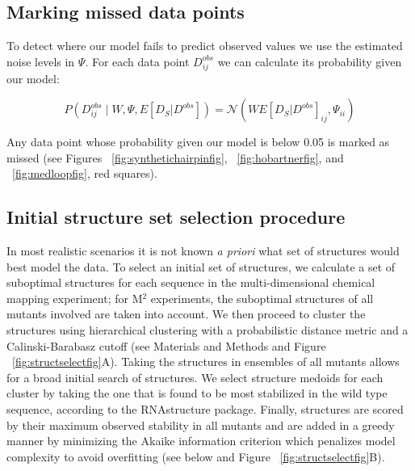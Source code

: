 \documentclass[12pt]{article}
\begin{document}
\subsection{Marking missed data points}
To detect where our model fails to predict observed values we use the estimated noise levels in $\Psi$. 
For each data point $D^{obs}_{ij}$ we can calculate its probability given our model: 

\[P(D^{obs}_{ij} \mid W,\Psi,E[D_S|D^{obs}]) = \mathcal{N}(WE[D_S|D^{obs}]_{ij},\Psi_{ii})\]

Any data point whose probability given our model is below 0.05 is marked as missed (see Figures ~\ref{fig:synthetichairpinfig}, ~\ref{fig:hobartnerfig}, and ~\ref{fig:medloopfig}, red squares).

\subsection{Initial structure set selection procedure}

In most realistic scenarios it is not known \textit{a priori} what set of structures would best model the data. 
To select an initial set of structures, we calculate a set of suboptimal structures for each sequence in the multi-dimensional chemical mapping experiment; for M$^2$ experiments, the suboptimal structures of all mutants involved are taken into account. 
We then proceed to cluster the structures using hierarchical clustering with a probabilistic distance metric and a Calinski-Barabasz cutoff (see Materials and Methods and Figure ~\ref{fig:structselectfig}A). 
Taking the structures in ensembles of all mutants allows for a broad initial search of structures. 
We select structure medoids for each cluster by taking the one that is found to be most stabilized in the wild type sequence, according to the RNAstructure package. 
Finally, structures are scored by their maximum observed stability in all mutants and are added in a greedy manner by minimizing the Akaike information criterion which penalizes model complexity to avoid overfitting \cite{Akaike1987} (see below and Figure ~\ref{fig:structselectfig}B).
\end{document}
